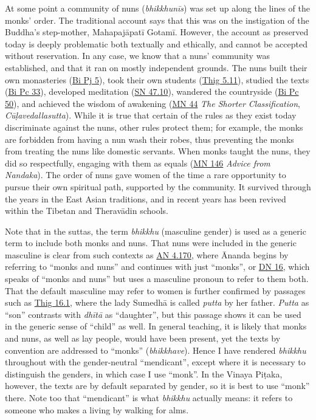 \documentclass[12pt,openany]{book}%
\begin{document}
At some point a community of nuns (\textit{\textsanskrit{bhikkhunīs}}) was set up along the lines of the monks’ order. The traditional account says that this was on the instigation of the Buddha’s step-mother, \textsanskrit{Mahapajāpatī} \textsanskrit{Gotamī}. However, the account as preserved today is deeply problematic both textually and ethically, and cannot be accepted without reservation. In any case, we know that a nuns’ community was established, and that it ran on mostly independent grounds. The nuns built their own monasteries (\href{https://suttacentral.net/pli{-}tv{-}bi{-}vb{-}pj5}{Bi Pj 5}), took their own students (\href{https://suttacentral.net/thig5.11}{Thig 5.11}), studied the texts (\href{https://suttacentral.net/pli{-}tv{-}bi{-}vb{-}pc{-}33}{Bi Pc 33}), developed meditation (\href{https://suttacentral.net/sn47.10}{SN 47.10}), wandered the countryside (\href{https://suttacentral.net/pli{-}tv{-}bi{-}vb{-}pc{-}50}{Bi Pc 50}), and achieved the wisdom of awakening (\href{https://suttacentral.net/mn44}{MN 44} \textit{The Shorter Classification}, \textit{\textsanskrit{Cūḷavedallasutta}}). While it is true that certain of the rules as they exist today discriminate against the nuns, other rules protect them; for example, the monks are forbidden from having a nun wash their robes, thus preventing the monks from treating the nuns like domestic servants. When monks taught the nuns, they did so respectfully, engaging with them as equals (\href{https://suttacentral.net/mn146}{MN 146} \textit{Advice from Nandaka}). The order of nuns gave women of the time a rare opportunity to pursue their own spiritual path, supported by the community. It survived through the years in the East Asian traditions, and in recent years has been revived within the Tibetan and \textsanskrit{Theravādin} schools.

Note that in the suttas, the term \textit{bhikkhu} (masculine gender) is used as a generic term to include both monks and nuns. That nuns were included in the generic masculine is clear from such contexts as \href{https://suttacentral.net/an4.170}{AN 4.170}, where Ānanda begins by referring to “monks and nuns” and continues with just “monks”, or \href{https://suttacentral.net/dn16}{DN 16}, which speaks of “monks and nuns” but uses a masculine pronoun to refer to them both. That the default masculine may refer to women is further confirmed by passages such as \href{https://suttacentral.net/thig16.1}{Thig 16.1}, where the lady \textsanskrit{Sumedhā} is called \textit{putta} by her father. \textit{Putta} as “son” contrasts with \textit{\textsanskrit{dhītā}} as “daughter”, but this passage shows it can be used in the generic sense of “child” as well. In general teaching, it is likely that monks and nuns, as well as lay people, would have been present, yet the texts by convention are addressed to “monks” (\textit{bhikkhave}). Hence I have rendered \textit{bhikkhu} throughout with the gender-neutral “mendicant”, except where it is necessary to distinguish the genders, in which case I use “monk”. In the Vinaya \textsanskrit{Piṭaka}, however, the texts are by default separated by gender, so it is best to use “monk” there. Note too that “mendicant” is what \textit{bhikkhu} actually means: it refers to someone who makes a living by walking for alms.
\end{document}
